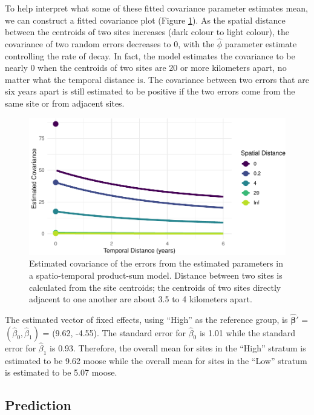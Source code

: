 \documentclass[smallextended]{svjour3}       %
\begin{document}
To help interpret what some of these fitted covariance parameter
estimates mean, we can construct a fitted covariance plot (Figure
\ref{fig:covplot}). As the spatial distance between the centroids of two
sites increases (dark colour to light colour), the covariance of two
random errors decreases to 0, with the \(\hat{\phi}\) parameter estimate
controlling the rate of decay. In fact, the model estimates the
covariance to be nearly 0 when the centroids of two sites are 20 or more
kilometers apart, no matter what the temporal distance is. The
covariance between two errors that are six years apart is still
estimated to be positive if the two errors come from the same site or
from adjacent sites.

\begin{figure}
\centering
\includegraphics{preprint_springer_files/figure-latex/covplot-1.pdf}
\caption{\label{fig:covplot} Estimated covariance of the errors from the
estimated parameters in a spatio-temporal product-sum model. Distance
between two sites is calculated from the site centroids; the centroids
of two sites directly adjacent to one another are about 3.5 to 4
kilometers apart.}
\end{figure}

The estimated vector of fixed effects, using ``High'' as the reference
group, is \(\bm{\hat{\beta}}'\) = \((\hat{\beta}_0, \hat{\beta}_1)\) =
(9.62, -4.55). The standard error for \(\hat{\beta}_0\) is 1.01 while
the standard error for \(\hat{\beta}_1\) is 0.93. Therefore, the overall
mean for sites in the ``High'' stratum is estimated to be 9.62 moose
while the overall mean for sites in the ``Low'' stratum is estimated to
be 5.07 moose.

\hypertarget{prediction}{%
\subsection{Prediction}\label{prediction}}
\end{document}
